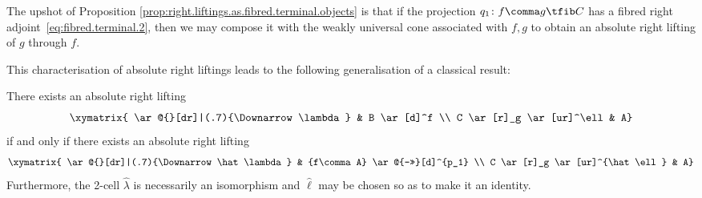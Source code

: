 \begin{obs}\label{obs:right.liftings.as.fibred.terminal.objects}
  The upshot of Proposition \ref{prop:right.liftings.as.fibred.terminal.objects} is that if the projection $q_1\colon f\comma g\tfib C$ has a fibred right adjoint~\eqref{eq:fibred.terminal.2}, then we may compose it with the weakly universal cone associated with $f\comma g$ to obtain an absolute right lifting of $g$ through $f$.
\end{obs}

This characterisation of absolute right liftings leads to the following generalisation of a classical result:

\begin{prop}\label{prop:translated.lifting}
  There exists an absolute right lifting
  \begin{equation}\label{eq:orig.lifting}
    \xymatrix{ \ar@{}[dr]|(.7){\Downarrow\lambda} & B \ar[d]^f \\ C \ar[r]_g \ar[ur]^\ell & A}
  \end{equation}
  if and only if there exists an absolute right lifting
  \begin{equation}\label{eq:translated.lifting}
    \xymatrix{ \ar@{}[dr]|(.7){\Downarrow\hat\lambda} & {f\comma A} \ar@{->>}[d]^{p_1} \\ C \ar[r]_g \ar[ur]^{\hat\ell} & A}
  \end{equation}
  Furthermore, the 2-cell $\hat\lambda$ is necessarily an isomorphism and $\hat\ell$ may be chosen so as to make it an identity.
\end{prop}

